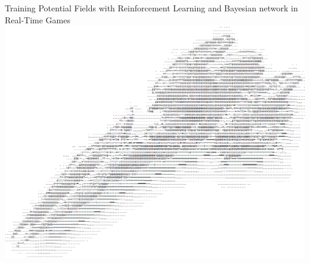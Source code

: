 \thispagestyle{empty}
\begin{center}
  \Huge
	Training Potential Fields with Reinforcement Learning and Bayesian network in Real-Time Games
	\vspace*{1.5in}~\\
	\hspace*{-1in}
    \includegraphics[scale=0.60]{Figures/FrontPage/FrontPage.png}
			
\end{center}



